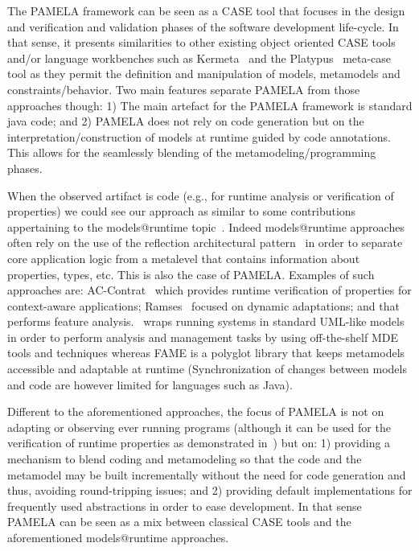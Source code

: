 The PAMELA framework can be seen as a CASE tool that focuses in the design and verification and validation phases of the software development life-cycle. In that sense, it presents similarities to other existing object oriented CASE tools and/or language workbenches such as Kermeta~\cite{kermeta} and the Platypus~\cite{platypus} meta-case tool as they permit the definition and manipulation of models, metamodels and constraints/behavior. Two main features separate PAMELA from those approaches though: 1) The main artefact for the PAMELA framework is standard java code; and 2) PAMELA does not rely on code generation but on the interpretation/construction of models at runtime guided by code annotations. This allows for the seamlessly blending of the metamodeling/programming phases.

When the observed artifact is code (e.g., for runtime analysis or verification of properties) we could see our approach as similar to some contributions appertaining to the models@runtime topic~\cite{bencomo2019models}. Indeed models@runtime approaches often rely  on the use of the reflection architectural pattern~\cite{buschmann2008pattern} in order to separate core application logic from a metalevel that contains information about properties, types, etc. This is also the case of PAMELA. 
Examples of such approaches are: AC-Contrat~\cite{accontract} which provides runtime verification of properties for context-aware applications; Ramses~\cite{ramses} focused on dynamic adaptations; and \cite{denker2010modeling} that performs feature analysis.~\cite{song2010applying} wraps running systems in standard UML-like models in order to perform analysis and management tasks by using off-the-shelf MDE tools and techniques whereas FAME \cite{kuhn2008fame} is a polyglot library that keeps metamodels accessible and adaptable at runtime (Synchronization of changes between models and code are however limited for languages such as Java).

Different to the aforementioned approaches, the focus of PAMELA is not on adapting or observing ever running programs (although it can be used for the verification of runtime properties as demonstrated in~\cite{silva20}) but on: 1) providing a mechanism to blend coding and metamodeling so that the code and the metamodel may be built incrementally without the need for code generation and thus, avoiding round-tripping issues; and 2) providing default implementations for frequently used abstractions in order to ease development. In that sense PAMELA can be seen as a mix between classical CASE tools and the aforementioned models@runtime approaches.


